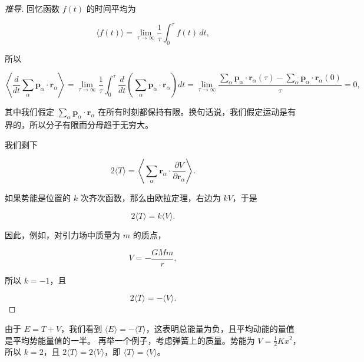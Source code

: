 \begin{proof}[推导]
回忆函数 $f(t)$ 的时间平均为

\[
\langle f(t)\rangle = \lim_{\tau\to\infty}\frac{1}{\tau}\int_0^{\tau} f(t)\,dt,
\]

所以

\[
\left\langle\frac{d}{dt}\sum_{\alpha}\mathbf{p}_\alpha\cdot\mathbf{r}_\alpha\right\rangle = \lim_{\tau\to\infty}\frac{1}{\tau}\int_0^{\tau}\frac{d}{dt}\left(\sum_{\alpha}\mathbf{p}_\alpha\cdot\mathbf{r}_\alpha\right)dt = \lim_{\tau\to\infty}\frac{\sum_{\alpha}\mathbf{p}_\alpha\cdot\mathbf{r}_\alpha(\tau) - \sum_{\alpha}\mathbf{p}_\alpha\cdot\mathbf{r}_\alpha(0)}{\tau} = 0,
\]

其中我们假定 $\sum_{\alpha}\mathbf{p}_\alpha\cdot\mathbf{r}_\alpha$ 在所有时刻都保持有限。换句话说，我们假定运动是有界的，所以分子有限而分母趋于无穷大。

我们剩下

\[
2\langle T\rangle = \left\langle\sum_{\alpha}\mathbf{r}_\alpha\cdot\frac{\partial V}{\partial \mathbf{r}_\alpha}\right\rangle.
\]

如果势能是位置的 $k$ 次齐次函数，那么由欧拉定理，右边为 $kV$，于是

\[
2\langle T\rangle = k\langle V\rangle.
\]

因此，例如，对引力场中质量为 $m$ 的质点，

\[
V = -\frac{GMm}{r},
\]

所以 $k = -1$，且

\[
2\langle T\rangle = -\langle V\rangle.
\]
\end{proof}
由于 $E = T + V$，我们看到 $\langle E\rangle = -\langle T\rangle$，这表明总能量为负，且平均动能的量值是平均势能量值的一半。
再举一个例子，考虑弹簧上的质量。势能为 $V = \frac{1}{2}Kx^2$，所以 $k = 2$，且 $2\langle T\rangle = 2\langle V\rangle$，即 $\langle T\rangle = \langle V\rangle$。
